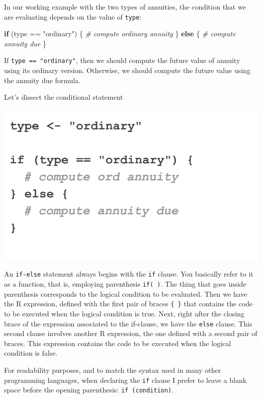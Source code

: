 \documentclass[
]{book}
\newenvironment{Shaded}{\begin{snugshade}}{\end{snugshade}}
\newcommand{\CommentTok}[1]{\textcolor[rgb]{0.56,0.35,0.01}{\textit{#1}}}
\newcommand{\ControlFlowTok}[1]{\textcolor[rgb]{0.13,0.29,0.53}{\textbf{#1}}}
\newcommand{\NormalTok}[1]{#1}
\newcommand{\SpecialCharTok}[1]{\textcolor[rgb]{0.00,0.00,0.00}{#1}}
\newcommand{\StringTok}[1]{\textcolor[rgb]{0.31,0.60,0.02}{#1}}
\begin{document}
In our working example with the two types of annuities, the condition that
we are evaluating depends on the value of \texttt{type}:

\begin{Shaded}
\begin{Highlighting}[]
\ControlFlowTok{if}\NormalTok{ (type }\SpecialCharTok{==} \StringTok{"ordinary"}\NormalTok{) \{}
  \CommentTok{\# compute ordinary annuity}
\NormalTok{\} }\ControlFlowTok{else}\NormalTok{ \{}
  \CommentTok{\# compute annuity due}
\NormalTok{\}}
\end{Highlighting}
\end{Shaded}

If \texttt{type\ ==\ "ordinary"},
then we should compute the future value of annuity using its ordinary version.
Otherwise, we should compute the future value using the annuity due formula.

Let's dissect the conditional statement

\begin{center}\includegraphics[width=0.5\linewidth]{images/conditionals/if-else-anatomy-1} \end{center}

An \texttt{if-else} statement always begins with the \texttt{if} clause. You basically refer
to it as a function, that is, employing parenthesis \texttt{if(\ )}. The thing that
goes inside parenthesis corresponds to the logical condition to be evaluated.
Then we have the R expression, defined with the first pair of braces \texttt{\{\ \}} that
contains the code to be executed when the logical condition is true. Next,
right after the closing brace of the expression associated to the if-clause, we
have the \texttt{else} clause. This second clause involves another R expression, the
one defined with a second pair of braces. This expression contains the code to
be executed when the logical condition is false.

For readability purposes, and to match the syntax used in many other programming
languages, when declaring the \texttt{if} clause I prefer to leave a blank space before
the opening parenthesis: \texttt{if\ (condition)}.
\end{document}
